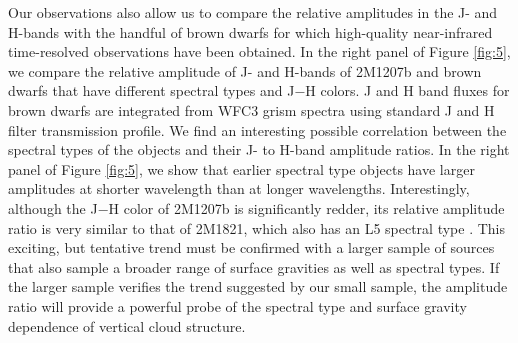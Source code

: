 \documentclass[apj]{emulateapj}
\begin{document}
Our observations also allow us to compare the relative amplitudes in
the J- and H-bands with the handful of brown dwarfs for which
high-quality near-infrared time-resolved observations have been
obtained. In the right panel of Figure \ref{fig:5}, we compare the
relative amplitude of J- and H-bands of 2M1207b and brown dwarfs
\citep{Apai2013,Buenzli2012,Buenzli2015,Yang2015} that have different
spectral types and J$-$H colors.  J and H band fluxes for brown dwarfs
are integrated from WFC3 grism spectra using standard J and H filter
transmission profile. We find an interesting possible correlation
between the spectral types of the objects and their J- to H-band
amplitude ratios. In the right panel of Figure \ref{fig:5}, we show
that earlier spectral type objects have larger amplitudes at shorter
wavelength than at longer wavelengths. Interestingly, although the
J$-$H color of 2M1207b is significantly redder, its relative amplitude
ratio is very similar to that of 2M1821, which also has an L5 spectral
type \citep{Yang2015}.  This exciting, but tentative trend must be
confirmed with a larger sample of sources that also sample a broader
range of surface gravities as well as spectral types.  If the larger
sample verifies the trend suggested by our small sample, the amplitude
ratio will provide a powerful probe of the spectral type and surface
gravity dependence of vertical cloud structure.



\end{document}
